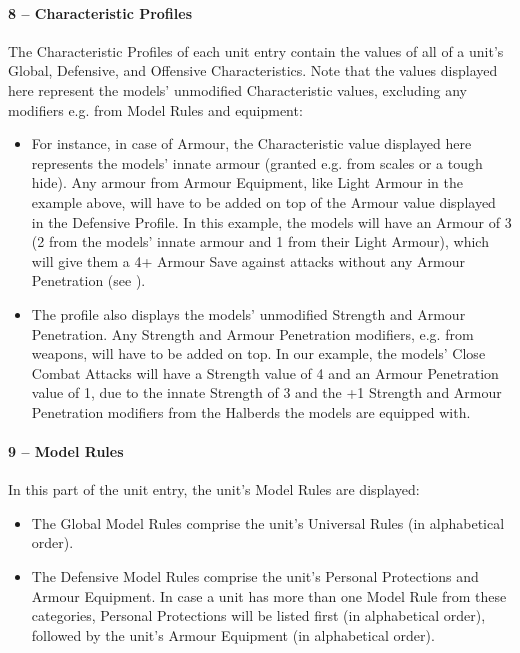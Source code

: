 \paragraph{8 -- Characteristic Profiles}

The Characteristic Profiles of each unit entry contain the values of all of a unit's Global, Defensive, and Offensive Characteristics. Note that the values displayed here represent the models' unmodified Characteristic values, excluding any modifiers e.g. from Model Rules and equipment:

\begin{itemize}
	\item For instance, in case of Armour, the Characteristic value displayed here represents the models' innate armour (granted e.g. from scales or a tough hide). Any armour from Armour Equipment, like Light Armour in the example above, will have to be added on top of the Armour value displayed in the Defensive Profile. In this example, the models will have an Armour of 3 (2 from the models' innate armour and 1 from their Light Armour), which will give them a 4+ Armour Save against attacks without any Armour Penetration (see ).
	\item The profile also displays the models' unmodified Strength and Armour Penetration. Any Strength and Armour Penetration modifiers, e.g. from weapons, will have to be added on top. In our example, the models' Close Combat Attacks will have a Strength value of 4 and an Armour Penetration value of 1, due to the innate Strength of 3 and the +1 Strength and Armour Penetration modifiers from the Halberds the models are equipped with.
\end{itemize}

\paragraph{9 -- Model Rules}

In this part of the unit entry, the unit's Model Rules are displayed:

\begin{itemize}
	\item The Global Model Rules comprise the unit's Universal Rules (in alphabetical order).
	\item The Defensive Model Rules comprise the unit's Personal Protections and Armour Equipment. In case a unit has more than one Model Rule from these categories, Personal Protections will be listed first (in alphabetical order), followed by the unit's Armour Equipment (in alphabetical order).
\end{itemize}

